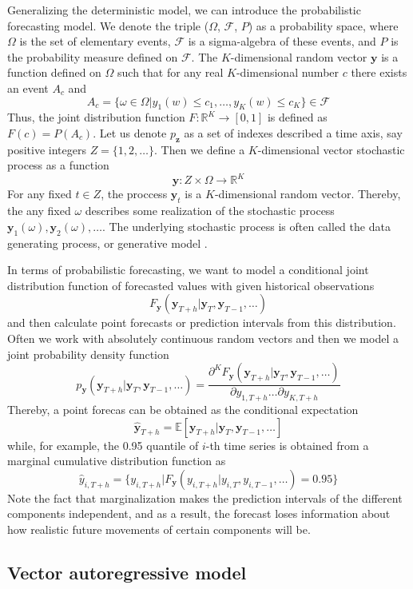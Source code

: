 \documentclass[12pt,a4paper]{article}
\begin{document}
Generalizing the deterministic model, we can introduce the probabilistic forecasting model. We denote the triple ($\Omega$, $\mathcal F$, $P$) as a probability space, where $\Omega$ is the set of elementary events, $\mathcal F$ is a sigma-algebra of these events, and $P$ is the probability measure defined on $\mathcal F$. The $K$-dimensional random vector $\mathbf y$ is a function defined on $\Omega$ such that for any real $K$-dimensional number $c$ there exists an event $A_c$ and
$$A_c = \{ \omega \in \Omega | y_1(w)\leq c_1, \dots, y_K(w) \leq c_K\} \in \mathcal F$$
Thus, the joint distribution function $F: \mathbb R^K \to[0, 1]$ is defined as $F(c)=P(A_c)$. Let us denote $p_\mathbf z$ as a set of indexes described a time axis, say positive integers $Z = \{1, 2, \dots\}$. Then we define a $K$-dimensional vector stochastic process as a function 
$$\mathbf y: Z \times \Omega \to \mathbb R^K$$
For any fixed $t \in Z$, the proccess $\mathbf y_t$ is a $K$-dimensional random vector. Thereby, the any fixed $\omega$ describes some realization of the stochastic process $\mathbf y_1(\omega), \mathbf y_2(\omega), \dots$. The underlying stochastic process is often called the data generating process, or generative model \cite{mts2007}.

In terms of probabilistic forecasting, we want to model a conditional joint distribution function of forecasted values with given historical observations
$$F_\mathbf{y}(\mathbf y_{T+h} | \mathbf y_{T}, \mathbf y_{T-1}, \dots)$$
and then calculate point forecasts or prediction intervals from this distribution. Often we work with absolutely continuous random vectors and then we model a joint probability density function
$$p_\mathbf{y}(\mathbf y_{T+h} | \mathbf y_{T}, \mathbf y_{T-1}, \dots) = \frac{\partial^K F_\mathbf{y}(\mathbf y_{T+h} | \mathbf y_{T}, \mathbf y_{T-1}, \dots)}{\partial y_{1, T+h}\dots\partial y_{K, T+h}}$$
Thereby, a point forecas can be obtained as the conditional expectation
$$\hat{\mathbf y}_{T+h} = \mathbb E[\mathbf y_{T+h} | \mathbf y_{T}, \mathbf y_{T-1}, \dots]$$
while, for example, the 0.95 quantile of $i$-th time series is obtained from a marginal cumulative distribution function as
$$\hat{y}_{i, T+h} = \{ y_{i, T+h} | F_\mathbf{y}(y_{i, T+h} | y_{i, T}, y_{i, T-1}, \dots) = 0.95 \}$$
Note the fact that marginalization makes the prediction intervals of the different components independent, and as a result, the forecast loses information about how realistic future movements of certain components will be.

\subsection{Vector autoregressive model}
\end{document}
